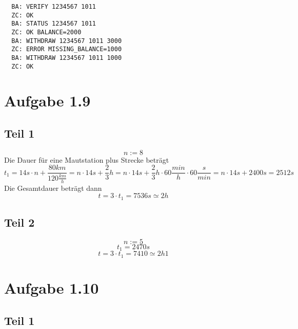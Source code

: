 \documentclass[10pt,a4paper]{article}
\begin{document}
\begin{lstlisting}
  BA: VERIFY 1234567 1011
  ZC: OK
  BA: STATUS 1234567 1011
  ZC: OK BALANCE=2000
  BA: WITHDRAW 1234567 1011 3000
  ZC: ERROR MISSING_BALANCE=1000
  BA: WITHDRAW 1234567 1011 1000
  ZC: OK
\end{lstlisting}

\section{Aufgabe 1.9}

\subsection{Teil 1}

\begin{equation}
  n := 8
\end{equation}
Die Dauer für eine Mautstation plus Strecke beträgt
\begin{equation}
  t_{1} = 14s \cdot n + \frac{80km}{120 \frac{km}{h}} = n \cdot 14s + \frac{2}{3}h = n \cdot 14s + \frac{2}{3}h \cdot 60 \frac{min}{h} \cdot 60 \frac{s}{min} = n \cdot 14s + 2400s = 2512s
\end{equation}
Die Gesamtdauer beträgt dann
\begin{equation}
  t = 3 \cdot t_{1} = 7536s \simeq 2h
\end{equation}

\subsection{Teil 2}

\begin{equation}
  n := 5
\end{equation}
\begin{equation}
  t_{1} = 2470s
\end{equation}
\begin{equation}
  t = 3 \cdot t_{1} = 7410 \simeq 2h1
\end{equation}

\section{Aufgabe 1.10}

\subsection{Teil 1}
\end{document}
